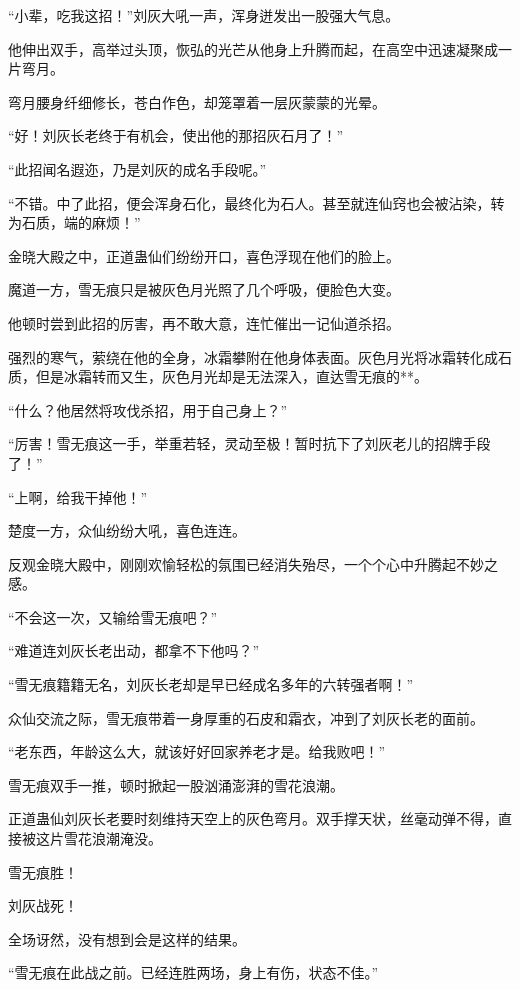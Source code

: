
\begin{this_body}

“小辈，吃我这招！”刘灰大吼一声，浑身迸发出一股强大气息。

他伸出双手，高举过头顶，恢弘的光芒从他身上升腾而起，在高空中迅速凝聚成一片弯月。

弯月腰身纤细修长，苍白作色，却笼罩着一层灰蒙蒙的光晕。

“好！刘灰长老终于有机会，使出他的那招灰石月了！”

“此招闻名遐迩，乃是刘灰的成名手段呢。”

“不错。中了此招，便会浑身石化，最终化为石人。甚至就连仙窍也会被沾染，转为石质，端的麻烦！”

金晓大殿之中，正道蛊仙们纷纷开口，喜色浮现在他们的脸上。

魔道一方，雪无痕只是被灰色月光照了几个呼吸，便脸色大变。

他顿时尝到此招的厉害，再不敢大意，连忙催出一记仙道杀招。

强烈的寒气，萦绕在他的全身，冰霜攀附在他身体表面。灰色月光将冰霜转化成石质，但是冰霜转而又生，灰色月光却是无法深入，直达雪无痕的**。

“什么？他居然将攻伐杀招，用于自己身上？”

“厉害！雪无痕这一手，举重若轻，灵动至极！暂时抗下了刘灰老儿的招牌手段了！”

“上啊，给我干掉他！”

楚度一方，众仙纷纷大吼，喜色连连。

反观金晓大殿中，刚刚欢愉轻松的氛围已经消失殆尽，一个个心中升腾起不妙之感。

“不会这一次，又输给雪无痕吧？”

“难道连刘灰长老出动，都拿不下他吗？”

“雪无痕籍籍无名，刘灰长老却是早已经成名多年的六转强者啊！”

众仙交流之际，雪无痕带着一身厚重的石皮和霜衣，冲到了刘灰长老的面前。

“老东西，年龄这么大，就该好好回家养老才是。给我败吧！”

雪无痕双手一推，顿时掀起一股汹涌澎湃的雪花浪潮。

正道蛊仙刘灰长老要时刻维持天空上的灰色弯月。双手撑天状，丝毫动弹不得，直接被这片雪花浪潮淹没。

雪无痕胜！

刘灰战死！

全场讶然，没有想到会是这样的结果。

“雪无痕在此战之前。已经连胜两场，身上有伤，状态不佳。”


\end{this_body}

